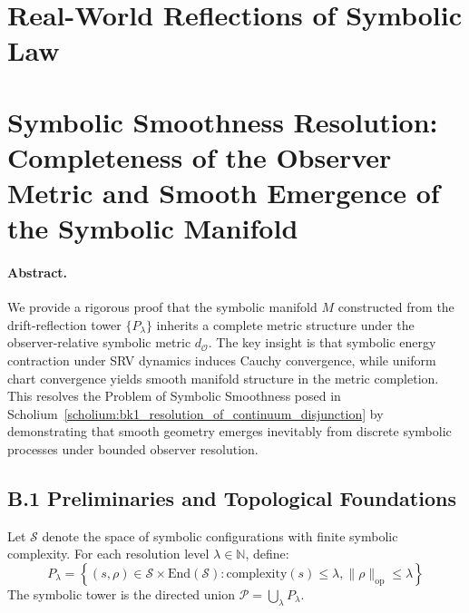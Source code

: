 \section*{Real-World Reflections of Symbolic Law} \label{sec:appB_real_world_reflections}


\clearpage
\section*{Symbolic Smoothness Resolution: Completeness of the Observer Metric and Smooth Emergence of the Symbolic Manifold}
\label{sec:appB_symbolic_smoothness_resolution}

\paragraph{Abstract.} We provide a rigorous proof that the symbolic manifold $M$ constructed from the drift-reflection tower $\{P_\lambda\}$ inherits a complete metric structure under the observer-relative symbolic metric $d_{\mathcal{O}}$. The key insight is that symbolic energy contraction under SRV dynamics induces Cauchy convergence, while uniform chart convergence yields smooth manifold structure in the metric completion. This resolves the Problem of Symbolic Smoothness posed in Scholium~\ref{scholium:bk1_resolution_of_continuum_disjunction} by demonstrating that smooth geometry emerges inevitably from discrete symbolic processes under bounded observer resolution.

\subsection*{B.1 Preliminaries and Topological Foundations}
\label{subsec:appB_preliminaries}

\begin{definition}
\label{definition:appB_symbolic_state_space}
Let $\mathcal{S}$ denote the space of symbolic configurations with finite symbolic complexity. For each resolution level $\lambda \in \mathbb{N}$, define:
\[
P_\lambda = \left\{(s, \rho) \in \mathcal{S} \times \text{End}(\mathcal{S}) : \text{complexity}(s) \leq \lambda, \|\rho\|_{\text{op}} \leq \lambda \right\}
\]
The symbolic tower is the directed union $\mathcal{P} = \bigcup_{\lambda} P_\lambda$.
\end{definition}

